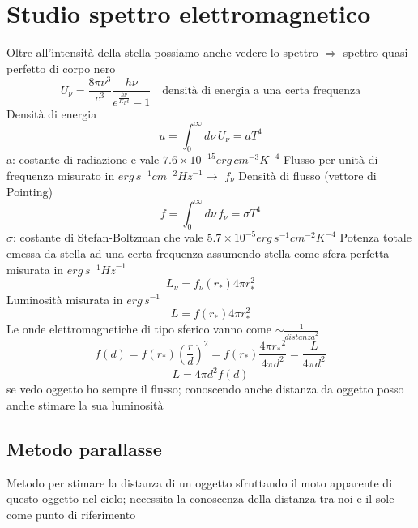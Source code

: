 \documentclass[a4paper,11pt]{report}
\theoremstyle{remark}
\theoremstyle{definition}
\begin{document}
\section*{Studio spettro elettromagnetico}
Oltre all'intensità della stella possiamo anche vedere lo spettro $\Rightarrow$ spettro quasi perfetto di corpo nero
\begin{equation*}
    U_\nu = \frac{8\pi \nu^3 }{c^3} \frac{h\nu}{e^{\frac{h\nu}{K_B t}}-1} \quad \text{densità di energia a una certa frequenza}
\end{equation*}
Densità di energia
\begin{equation*}
    u = \int _0^\infty d\nu \, U_\nu = aT^4
\end{equation*}
a: costante di radiazione e vale $7.6 \times 10^{-15} erg \, cm^{-3}K^{-4}$ \newline
Flusso per unità di frequenza misurato in $erg \, s^{-1} cm^{-2}{Hz}^{-1} \rightarrow$ $f_\nu$\newline
Densità di flusso (vettore di Pointing)
\begin{equation*}
    f = \int_0^\infty d\nu \, f_\nu = \sigma T^4
\end{equation*}
$\sigma$: costante di Stefan-Boltzman che vale $5.7 \times 10^{-5} erg \, s^{-1} {cm}^{-2}K^{-4}$ \newline
Potenza totale emessa da stella ad una certa frequenza assumendo stella come sfera perfetta misurata in $erg \, s^{-1}{Hz}^{-1}$
\begin{equation*}
    L_\nu = f_\nu (r_*) 4\pi r_*^2
\end{equation*}
Luminosità misurata in $erg \, s^{-1}$
\begin{equation*}
    L = f(r_*)4\pi r_*^2
\end{equation*}
Le onde elettromagnetiche di tipo sferico vanno come $\sim \frac{1}{{distanza}^2}$ 
\begin{equation*}
    f(d) = f(r_*){\left(\frac{r}{d}\right)}^2 = f(r_*)\frac{4\pi {r_*}^2}{4\pi d^2} = \frac{L}{4\pi d^2}
\end{equation*}
\begin{equation}
    L = 4\pi d^2 f(d)
\end{equation}
se vedo oggetto ho sempre il flusso; conoscendo anche distanza da oggetto posso anche stimare la sua luminosità

\subsection*{Metodo parallasse}
Metodo per stimare la distanza di un oggetto sfruttando il moto apparente di questo oggetto nel cielo; necessita la conoscenza della distanza tra noi e il sole come punto di riferimento \newline
\end{document}
